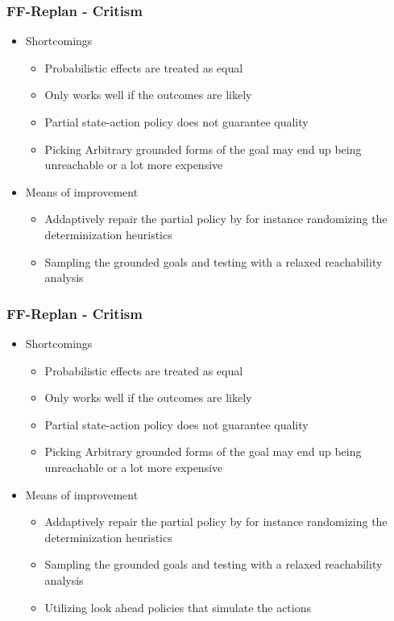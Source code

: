 \documentclass{beamer}
\let\origframetitle=\frametitle
\renewcommand\frametitle[1]{\origframetitle{\textbf{\large{\textrm{#1}}}}}
\begin{document}
\begin{frame}
  \frametitle{FF-Replan - Critism}
  \begin{itemize}
    \item Shortcomings
      \begin{itemize}
        \item Probabilistic effects are treated as equal
        \item Only works well if the outcomes are likely
	\item Partial state-action policy does not guarantee quality
	\item Picking Arbitrary grounded forms of the goal may end up being unreachable or a lot more expensive
      \end{itemize}
    \item Means of improvement
      \begin{itemize}
        \item Addaptively repair the partial policy by for instance randomizing the determinization heuristics
	\item Sampling the grounded goals and testing with a relaxed reachability analysis
      \end{itemize}
   \end{itemize}
\end{frame}




\begin{frame}
  \frametitle{FF-Replan - Critism}
  \begin{itemize}
    \item Shortcomings
      \begin{itemize}
        \item Probabilistic effects are treated as equal
        \item Only works well if the outcomes are likely
	\item Partial state-action policy does not guarantee quality
	\item Picking Arbitrary grounded forms of the goal may end up being unreachable or a lot more expensive
      \end{itemize}
    \item Means of improvement
      \begin{itemize}
        \item Addaptively repair the partial policy by for instance randomizing the determinization heuristics
	\item Sampling the grounded goals and testing with a relaxed reachability analysis
	\item Utilizing look ahead policies that simulate the actions
      \end{itemize}
   \end{itemize}
\end{frame}
\end{document}
